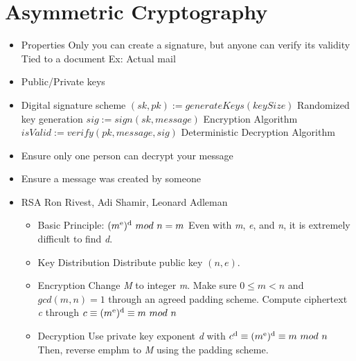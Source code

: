 \documentclass{article}
\begin{document}
\begin{itemize}
\begin{enumerate}
    \end{enumerate}
\end{itemize}

\section*{Asymmetric Cryptography}
\begin{itemize}
  \item Properties
    \subitem Only you can create a signature, but anyone can verify its validity
    \subitem Tied to a document
    \subitem Ex: Actual mail
  \item Public/Private keys
  \item Digital signature scheme
    \subitem $ (sk, pk) := generateKeys(keySize) $ Randomized key generation
    \subitem $ sig := sign(sk, message) $ Encryption Algorithm
    \subitem $ isValid := verify(pk, message, sig) $ Deterministic Decryption Algorithm
  \item Ensure only one person can decrypt your message
  \item Ensure a message was created by someone
  \item RSA
    \subitem Ron Rivest, Adi Shamir, Leonard Adleman
    \begin{itemize}
      \item Basic Principle: $ (m\textsuperscript{e})\textsuperscript{d}\ mod\ n = m $
        \subitem Even with \emph{m}, \emph{e}, and \emph{n}, it is extremely difficult to find \emph{d}.
      \item Key Distribution
        \subitem Distribute public key $ (n, e) $. 
      \item Encryption
        \subitem Change \emph{M} to integer \emph{m}. Make sure $ 0 \leq m < n $ and $ gcd(m, n) = 1 $ through an agreed padding scheme.
        \subitem Compute ciphertext \emph{c} through $ c \equiv (m\textsuperscript{e})\textsuperscript{d} \equiv m\ mod\ n $
      \item Decryption
        \subitem Use private key exponent \emph{d} with $ c\textsuperscript{d} \equiv (m\textsuperscript{e})\textsuperscript{d} \equiv m\ mod\ n $
        \subitem Then, reverse emph{m} to \emph{M} using the padding scheme.


\end{itemize}
\end{itemize}
\end{document}
